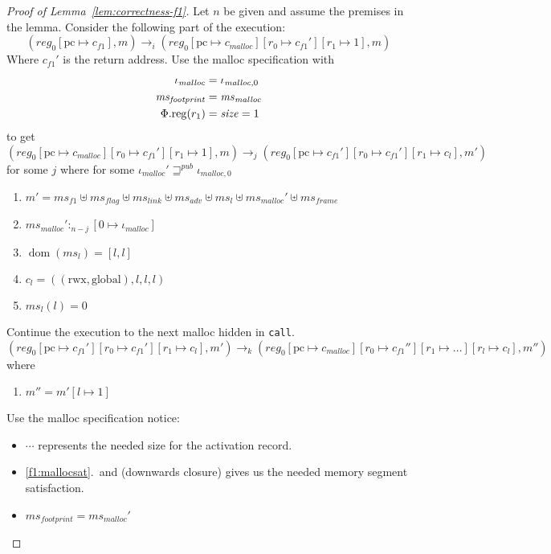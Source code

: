 \documentclass[a4paper]{article}
\newcommand{\update}[2]{[#1 \mapsto #2]}
\DeclareMathOperator{\dom}{dom}
\newcommand{\var}[1]{\mathit{#1}}
\newcommand{\hs}{\var{ms}}
\newcommand{\ms}{\hs}
\newcommand{\pcreg}{\mathrm{pc}}
\newcommand{\reg}{\var{reg}}
\newcommand{\heap}{\var{mem}}
\newcommand{\adv}{\var{adv}}
\newcommand{\flag}{\var{flag}}
\newcommand{\plainproj}[1]{\mathrm{#1}}
\newcommand{\memreg}[1][\Phi]{#1.\plainproj{reg}}
\newcommand{\futurewk}{\mathbin{\sqsupseteq}^{\var{pub}}}
\newcommand{\heapSat}[3][\heap]{#1 :_{#2} #3}
\newcommand{\codelabel}[1]{\mathit{#1}}
\newcommand{\malloc}{\codelabel{malloc}}
\newcommand{\plainperm}[1]{\mathrm{#1}}
\newcommand{\rwx}{\plainperm{rwx}}
\newcommand{\glob}{\plainperm{global}}
\newcommand{\step}[1][]{\rightarrow_{#1}}
\begin{document}
\begin{proof}[Proof of Lemma~\ref{lem:correctness-f1}]
  Let $n$ be given and assume the premises in the lemma.  Consider the following part of the execution:
  \[
    (\reg_0\update{\pcreg}{c_{f1}},m) \step[i] (\reg_0\update{\pcreg}{c_\malloc}\update{r_0}{c_{f1}'}\update{r_1}{1},m)
  \]
  Where $c_{f1}'$ is the return address. Use the malloc specification with
  \begin{align*}
    \iota_\malloc &= \iota_{\malloc,0} \\
    \ms_{\var{footprint}} & = \ms_\malloc \\
    \memreg(r_1) & = \size = 1
  \end{align*}
  to get 
  \[
    (\reg_0\update{\pcreg}{c_\malloc}\update{r_0}{c_{f1}'}\update{r_1}{1},m) \step[j] (\reg_0\update{\pcreg}{c_{f1}'}\update{r_0}{c_{f1}'}\update{r_1}{c_l},m')
  \]
  for some $j$ where for some $\iota_{\malloc}' \futurewk \iota_{\malloc,0}$
  \begin{enumerate}
  \item $m' = \hs_{f1} \uplus 
    \hs_\flag \uplus                
    \ms_{\var{link}} \uplus 
    \hs_\adv \uplus 
    \ms_l \uplus
    \ms_{\malloc}' \uplus 
    \hs_{\var{frame}} $
  \item $\heapSat[\ms_{\malloc}']{n-j}{[0 \mapsto \iota_{\malloc}]}$ \label{f1:mallocsat}
  \item $\dom(\hs_l) = [l,l]$
  \item $c_l = ((\rwx,\glob),l,l,l)$ \label{test}
  \item $\ms_l(l) = 0$
  \end{enumerate}
  Continue the execution to the next malloc hidden in \texttt{call}.
  \[
    (\reg_0\update{\pcreg}{c_{f1}'}\update{r_0}{c_{f1}'}\update{r_1}{c_l},m')
    \step[k]
    (\reg_0\update{\pcreg}{c_\malloc}\update{r_0}{c_{f1}''}\update{r_1}{\dots}\update{r_l}{c_l},m'')
  \]
  where
  \begin{enumerate}[resume]
  \item $m'' = m'[l\mapsto 1]$
  \end{enumerate}
  Use the malloc specification notice:
  \begin{itemize}
  \item $\cdots$ represents the needed size for the activation record. 
  \item \ref{f1:mallocsat}.\ and (downwards closure) gives us the needed memory segment satisfaction.
  \item $\ms_{\var{footprint}} =  \ms_\malloc' $
  \end{itemize}

\end{proof}
\end{document}
